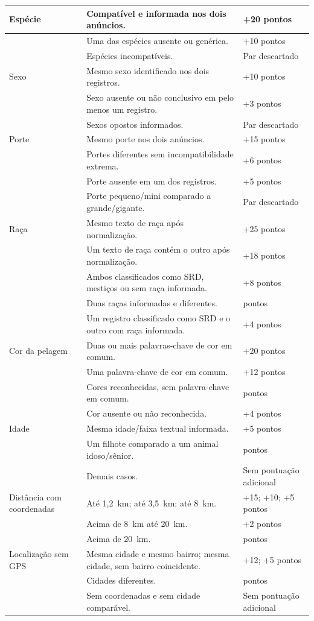 {\begin{longtable}{|>{\raggedright\arraybackslash}p{3.3cm}|>{\raggedright\arraybackslash}p{8.4cm}|>{\centering\arraybackslash}p{2.5cm}|}
Espécie & Compatível e informada nos dois anúncios. & +20 pontos \\ \cline{2-3}
& Uma das espécies ausente ou genérica. & +10 pontos \\ \cline{2-3}
& Espécies incompatíveis. & Par descartado \\ \hline
Sexo & Mesmo sexo identificado nos dois registros. & +10 pontos \\ \cline{2-3}
& Sexo ausente ou não conclusivo em pelo menos um registro. & +3 pontos \\ \cline{2-3}
& Sexos opostos informados. & Par descartado \\ \hline
Porte & Mesmo porte nos dois anúncios. & +15 pontos \\ \cline{2-3}
& Portes diferentes sem incompatibilidade extrema. & +6 pontos \\ \cline{2-3}
& Porte ausente em um dos registros. & +5 pontos \\ \cline{2-3}
& Porte pequeno/mini comparado a grande/gigante. & Par descartado \\ \hline
Raça & Mesmo texto de raça após normalização. & +25 pontos \\ \cline{2-3}
& Um texto de raça contém o outro após normalização. & +18 pontos \\ \cline{2-3}
& Ambos classificados como SRD, mestiços ou sem raça informada. & +8 pontos \\ \cline{2-3}
& Duas raças informadas e diferentes. & -20 pontos \\ \cline{2-3}
& Um registro classificado como SRD e o outro com raça informada. & +4 pontos \\ \hline
Cor da pelagem & Duas ou mais palavras-chave de cor em comum. & +20 pontos \\ \cline{2-3}
& Uma palavra-chave de cor em comum. & +12 pontos \\ \cline{2-3}
& Cores reconhecidas, sem palavra-chave em comum. & -25 pontos \\ \cline{2-3}
& Cor ausente ou não reconhecida. & +4 pontos \\ \hline
Idade & Mesma idade/faixa textual informada. & +5 pontos \\ \cline{2-3}
& Um filhote comparado a um animal idoso/sênior. & -15 pontos \\ \cline{2-3}
& Demais casos. & Sem pontuação adicional \\ \hline
Distância com coordenadas & Até 1,2~km; até 3,5~km; até 8~km. & +15; +10; +5 pontos \\ \cline{2-3}
& Acima de 8~km até 20~km. & +2 pontos \\ \cline{2-3}
& Acima de 20~km. & -15 pontos \\ \hline
Localização sem GPS & Mesma cidade e mesmo bairro; mesma cidade, sem bairro coincidente. & +12; +5 pontos \\ \cline{2-3}
& Cidades diferentes. & -20 pontos \\ \cline{2-3}
& Sem coordenadas e sem cidade comparável. & Sem pontuação adicional \\ \hline
\end{longtable}
}

